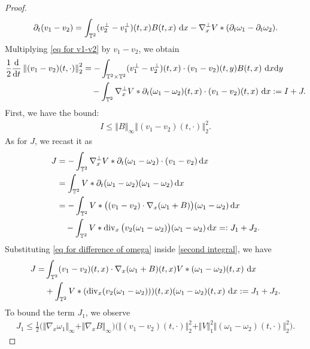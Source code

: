 \documentclass[11pt,reqno]{amsart}
\numberwithin{equation}{section}
\def\dd{{\rm d}}
\begin{document}
\begin{proof}
\begin{align}
\partial_{t}(v_{1}-v_{2})=\int_{\mathbb{T}^{2}}(v_{2}^{\perp}-v_{1}^{\perp})(t,x)B(t,x)\ \dd x-\nabla_{x}^{\perp}V\ast (\partial_{t}\omega_{1}-\partial_{t}\omega_{2}). \label{eq for v1-v2}    \end{align}
Multiplying \eqref{eq for v1-v2} by $v_{1}-v_{2}$, we obtain
\begin{align}
\frac{1}{2}\frac{\dd}{\dd t}\left\Vert (v_{1}-v_{2})(t,\cdot)\right\Vert_{2}^{2}&=-\int_{\mathbb{T}^{2}\times \mathbb{T}^{2}}(v_{1}^{\perp}-v_{2}^{\perp})(t,x)\cdot (v_{1}-v_{2})(t,y)B(t,x)\ \dd x\dd y \notag\\
&\quad-\int_{\mathbb{T}^{2}}\nabla_{x}^{\perp}V\ast \partial_{t}(\omega_{1}-\omega_{2})(t,x)\cdot (v_{1}-v_{2})(t,x)\ \dd x:= I+J. \label{time der of diff of v} 
\end{align} 
First, we have the bound: 
\begin{align}
I\leq \left\Vert B\right\Vert_{\infty}\left\Vert (v_{1}-v_{2})(t,\cdot)\right\Vert_{2}^{2}. \label{est I} 
\end{align}
As for $J$, we recast it as 
\begin{align}
J
&=-\int_{\mathbb T^2}\nabla_x^\perp V*\partial_t(\omega_1-\omega_2)\cdot(v_1-v_2)\,\dd x\notag\\
&=\int_{\mathbb T^2}V*\partial_t(\omega_1-\omega_2)(\omega_1-\omega_2)\,\dd x\notag\\
&=-\int_{\mathbb T^2}V*\big((v_1-v_2)\cdot\nabla_x(\omega_1+B)\big)(\omega_1-\omega_2)\,\dd x\notag\\
&\quad-\int_{\mathbb T^2}V*\operatorname{div}_x\big(v_2(\omega_1-\omega_2)\big)(\omega_1-\omega_2)\,\dd x
=:J_1+J_2.\label{second integral}
\end{align}
Substituting \eqref{eq for difference of omega} inside \eqref{second integral}, we have 
\begin{align*}
J=&\int_{\mathbb{T}^{2}}(v_{1}-v_{2})(t,x)\cdot \nabla_{x}(\omega_{1}+B)(t,x)V\ast (\omega_{1}-\omega_{2})(t,x)\ \dd x\\
&+\int_{\mathbb{T}^{2}}V\ast(\mathrm{div}_{x}(v_{2}(\omega_{1}-\omega_{2})))(t,x)(\omega_{1}-\omega_{2})(t,x)\ \dd x:= J_{1}+J_{2}.  
\end{align*}
To bound the term $J_{1}$, we observe 
\begin{align}
J_{1}\leq \frac{1}{2}\big(\Vert \nabla_{x}\omega_{1}\Vert_{\infty}
+\Vert \nabla_{x}B\Vert_{\infty}\big)\big(\Vert (v_{1}-v_{2})(t,\cdot)\Vert_{2}^{2}
+\Vert V\Vert_{1}^{2} \Vert (\omega_{1}-\omega_{2})(t,\cdot)\Vert_{2}^{2}\big). \label{J1ES}   

\end{align}
\end{proof}
\end{document}
